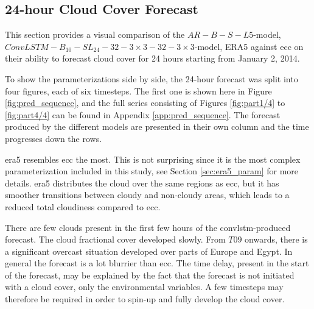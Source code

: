 \subsection{24-hour Cloud Cover Forecast}
This section provides a visual comparison of the $AR-B-S-L5$-model, $ConvLSTM-B_{10}-SL_{24}-32-3\times3-32-3 \times3$-model, ERA5 against \acrshort{ecc} on their ability to forecast cloud cover for 24 hours starting from January 2, 2014.

To show the parameterizations side by side, the 24-hour forecast was split into four figures, each of six timesteps. The first one is shown here in Figure \ref{fig:pred_sequence}, and the full series consisting of Figures \ref{fig:part1/4} to \ref{fig:part4/4} can be found in Appendix \ref{app:pred_sequence}. %
The forecast produced by the different models are presented in their own column and the time progresses down the rows. 

\acrshort{era5} resembles \acrshort{ecc} the most. This is not surprising since it is the most complex parameterization included in this study, see Section \ref{sec:era5_param} for more details. \acrshort{era5} distributes the cloud over the same regions as \acrshort{ecc}, but it has smoother transitions between cloudy and non-cloudy areas, which leads to a reduced total cloudiness compared to \acrshort{ecc}.

There are few clouds present in the first few hours of the \acrshort{convlstm}-produced forecast. The cloud fractional cover developed slowly. From $T09$ onwards, there is a significant overcast situation developed over parts of Europe and Egypt. In general the forecast is a lot blurrier than \acrshort{ecc}. The time delay, present in the start of the forecast, may be explained by the fact that the forecast is not initiated with a cloud cover, only the environmental variables. A  few timesteps may therefore be required in order to spin-up and fully develop the cloud cover.

